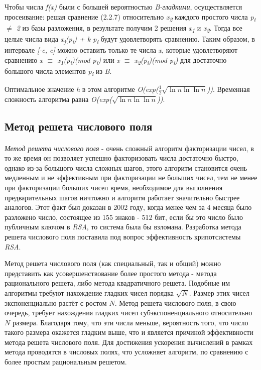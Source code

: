   Чтобы числа \textit{f(x)} были с большей вероятностью \textit{B-гладкими}, осуществляется просеивание: решая сравнение (2.2.7) относительно \textit{x\textsubscript{2}}
  каждого простого числа \textit{p\textsubscript{i} {$\ne$} 2} из базы разложения, в результате получим 2 решения \textit{x\textsubscript{1}} и \textit{x\textsubscript{2}}. 
  Тогда все целые числа вида \textit{x\textsubscript{j}(p\textsubscript{i}) + k p\textsubscript{i}} будут удовлетворять сравнению. Таким образом, в 
  интервале \textit{[-c, c]} можно оставить только те числа \textit{x}, которые удовлетворяют сравнению \textit{x {$\equiv$} x\textsubscript{1}(p\textsubscript{i})(mod p\textsubscript{i})} 
  или \textit{x {$\equiv$} x\textsubscript{2}(p\textsubscript{i})(mod p\textsubscript{i})} для достаточно большого числа элементов 
  \textit{p\textsubscript{i}} из \textit{B}.
  
  Оптимальное значение \textit{h} в этом алгоритме \textit{O(exp({$\frac{1}{2}$}{$\sqrt{\ln{n}\ln{\ln{n}}}$}))}. Временная сложность 
  алгоритма равна \textit{O(exp({$\sqrt{\ln{n}\ln{\ln{n}}}$}))}.

\subsection{Метод решета числового поля}

\paragraph{} \textit{Метод решета числового поля} - очень сложный алгоритм факторизации чисел, в то же время он позволяет успешно факторизовать числа
  достаточно быстро, однако из-за большого числа сложных шагов, этого алгоритм становится очень медленным и не эффективным при факторизации
  не больших чисел, тем не менее при факторизации больших чисел время, необходимое для выполнения предварительных шагов ничтожно и алгоритм работает
  значительно быстрее аналогов. Этот факт был доказан в 2002 году, когда менее чем за 4 месяца было разложено число, состоящее из 155
  знаков - 512 бит, если бы это число было публичным ключом в \textit{RSA}, то система была бы взломана. Разработка метода решета числового поля 
  поставила под вопрос эффективность крипотсистемы \textit{RSA}.
  
  Метод решета числового поля (как специальный, так и общий) можно представить как усовершенствование более простого метода - метода 
  рационального решета, либо метода квадратичного решета. Подобные им алгоритмы требуют нахождение гладких чисел порядка {$\sqrt{N}$}. 
  Размер этих чисел экспоненциально растёт с ростом {$N$}. Метод решета числового поля, в свою очередь, требует нахождения гладких чисел 
  субэкспоненциального относительно {$N$} размера. Благодаря тому, что эти числа меньше, вероятность того, что число такого размера окажется гладким выше, что и 
  является причиной эффективности метода решета числового поля. Для достижения ускорения вычислений в рамках метода проводятся в числовых 
  полях, что усложняет алгоритм, по сравнению с более простым рациональным решетом.
  

